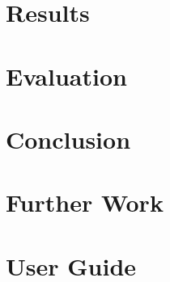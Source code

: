 \documentclass[12pt]{article}
\begin{document}
\section{Results}

\section{Evaluation}

\section{Conclusion}

\section{Further Work}

\section{User Guide}

\newpage
\appendix

% 


\end{document}
